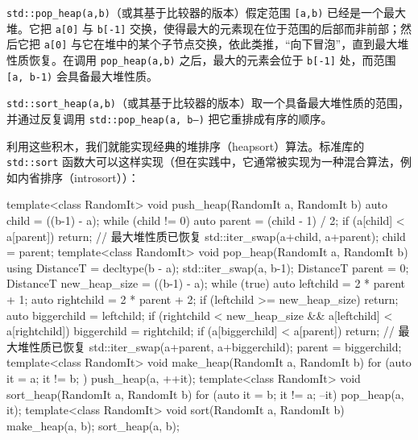 \texttt{std::\allowbreak{}pop\_\allowbreak{}heap(\allowbreak{}a,\allowbreak{}b)\allowbreak{}}（或其基于比较器的版本）假定范围 \texttt{[a,\allowbreak{}b)\allowbreak{}} 已经是一个最大堆。它把 \texttt{a[0]} 与 \texttt{b[-1]} 交换，使得最大的元素现在位于范围的后部而非前部；然后它把 \texttt{a[0]} 与它在堆中的某个子节点交换，依此类推，“向下冒泡”，直到最大堆性质恢复。在调用 \texttt{pop\_\allowbreak{}heap(\allowbreak{}a,\allowbreak{}b)\allowbreak{}} 之后，最大的元素会位于 \texttt{b[-1]} 处，而范围 \texttt{[a,\allowbreak{} b-1)\allowbreak{}} 会具备最大堆性质。

\texttt{std::\allowbreak{}sort\_\allowbreak{}heap(\allowbreak{}a,\allowbreak{}b)\allowbreak{}}（或其基于比较器的版本）取一个具备最大堆性质的范围，并通过反复调用 \texttt{std::\allowbreak{}pop\_\allowbreak{}heap(\allowbreak{}a,\allowbreak{} b--)\allowbreak{}} 把它重排成有序的顺序。

利用这些积木，我们就能实现经典的堆排序（heapsort）算法。标准库的 \texttt{std::\allowbreak{}sort} 函数大可以这样实现（但在实践中，它通常被实现为一种混合算法，例如内省排序（introsort））：

\begin{codebox}[cpp]
     template<class RandomIt>
     void push_heap(RandomIt a, RandomIt b)
     {
       auto child = ((b-1) - a);
       while (child != 0) {
         auto parent = (child - 1) / 2;
         if (a[child] < a[parent]) {
           return; // 最大堆性质已恢复
         }
         std::iter_swap(a+child, a+parent);
         child = parent;
       }
     }
     template<class RandomIt>
     void pop_heap(RandomIt a, RandomIt b)
     {
       using DistanceT = decltype(b - a);
       std::iter_swap(a, b-1);
       DistanceT parent = 0;
       DistanceT new_heap_size = ((b-1) - a);
       while (true) {
         auto leftchild = 2 * parent + 1;
         auto rightchild = 2 * parent + 2;
         if (leftchild >= new_heap_size) {
           return;
         }
         auto biggerchild = leftchild;
         if (rightchild < new_heap_size && a[leftchild] < a[rightchild]) {
           biggerchild = rightchild;
         }
         if (a[biggerchild] < a[parent]) {
           return; // 最大堆性质已恢复
         }
         std::iter_swap(a+parent, a+biggerchild);
         parent = biggerchild;
       }
     }
     template<class RandomIt>
     void make_heap(RandomIt a, RandomIt b)
     {
       for (auto it = a; it != b; ) {
         push_heap(a, ++it);
       }
     }
     template<class RandomIt>
     void sort_heap(RandomIt a, RandomIt b)
     {
       for (auto it = b; it != a; --it) {
         pop_heap(a, it);
       }
     }
     template<class RandomIt>
     void sort(RandomIt a, RandomIt b)
     {
       make_heap(a, b);
       sort_heap(a, b);
     }
\end{codebox}

